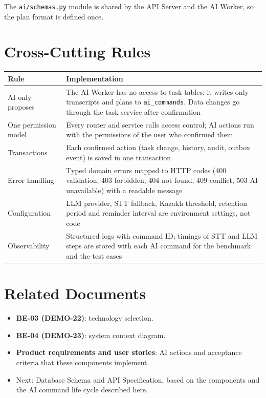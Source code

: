 \documentclass[11pt,a4paper]{article}
\newcommand{\tblstart}{\small\rowcolors{2}{gray!7}{white}}
\newcommand{\code}[1]{\texttt{#1}}
\begin{document}
The \code{ai/schemas.py} module is shared by the API Server and the AI Worker, so the plan format is defined once.

\section{Cross-Cutting Rules}

{\tblstart
\begin{xltabular}{\textwidth}{P{3.6cm} L}
\toprule
\textbf{Rule} & \textbf{Implementation} \\
\midrule
\endhead
AI only proposes & The AI Worker has no access to task tables; it writes only transcripts and plans to \code{ai\_commands}. Data changes go through the task service after confirmation \\
One permission model & Every router and service calls access control; AI actions run with the permissions of the user who confirmed them \\
Transactions & Each confirmed action (task change, history, audit, outbox event) is saved in one transaction \\
Error handling & Typed domain errors mapped to HTTP codes (400 validation, 403 forbidden, 404 not found, 409 conflict, 503 AI unavailable) with a readable message \\
Configuration & LLM provider, STT fallback, Kazakh threshold, retention period and reminder interval are environment settings, not code \\
Observability & Structured logs with command ID; timings of STT and LLM steps are stored with each AI command for the benchmark and the test cases \\
\bottomrule
\end{xltabular}}

\section{Related Documents}

\begin{itemize}
  \item \textbf{BE-03 (DEMO-22)}: technology selection.
  \item \textbf{BE-04 (DEMO-23)}: system context diagram.
  \item \textbf{Product requirements and user stories}: AI actions and acceptance criteria that these components implement.
  \item Next: Database Schema and API Specification, based on the components and the AI command life cycle described here.
\end{itemize}
\end{document}
